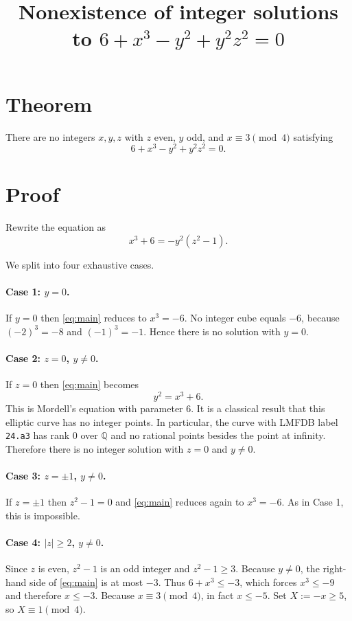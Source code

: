 \documentclass[11pt]{article}
\title{Nonexistence of integer solutions to $6+x^{3}-y^{2}+y^{2}z^{2}=0$}
\author{}
\date{}
\begin{document}
\maketitle

\section*{Theorem}
There are no integers $x,y,z$ with $z$ even, $y$ odd, and $x\equiv 3\pmod 4$ satisfying
\[6 + x^{3} - y^{2} + y^{2}z^{2}=0.\]

\section*{Proof}
Rewrite the equation as
\begin{equation}\label{eq:main}
x^{3}+6 = -y^{2}(z^{2}-1).
\end{equation}

We split into four exhaustive cases.

\paragraph{Case 1: $y=0$.}
If $y = 0$ then \eqref{eq:main} reduces to $x^{3} = -6$. No integer cube
equals $-6$, because $(-2)^3 = -8$ and $(-1)^3 = -1$. Hence there is no
solution with $y=0$.

\paragraph{Case 2: $z=0$, $y\neq 0$.}
If $z = 0$ then \eqref{eq:main} becomes
\begin{equation}\label{eq:mordell}
y^{2} = x^{3} + 6.
\end{equation}
This is Mordell's equation with parameter $6$. It is a classical result that
this elliptic curve has no integer points. In particular, the curve with
LMFDB label \texttt{24.a3} has rank $0$ over $\mathbb Q$ and no rational
points besides the point at infinity. Therefore there is no integer solution
with $z=0$ and $y\neq 0$.

\paragraph{Case 3: $z=\pm 1$, $y\neq 0$.}
If $z = \pm 1$ then $z^{2}-1 = 0$ and \eqref{eq:main} reduces again to
$x^{3} = -6$. As in Case 1, this is impossible.

\paragraph{Case 4: $|z|\ge 2$, $y\neq 0$.}
Since $z$ is even, $z^{2}-1$ is an odd integer and $z^{2}-1 \ge 3$. Because
$y\neq 0$, the right-hand side of \eqref{eq:main} is at most $-3$. Thus
$6+x^{3} \le -3$, which forces $x^{3} \le -9$ and therefore $x \le -3$. Because
$x\equiv 3 \pmod 4$, in fact $x \le -5$. Set $X := -x\ge 5$, so
$X \equiv 1 \pmod 4$.
\end{document}
